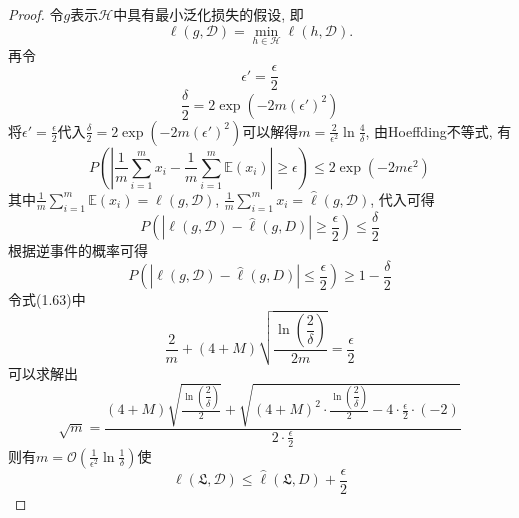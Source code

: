 \begin{proof}
令$g$表示$\mathcal{H}$中具有最小泛化损失的假设, 即
 \begin{equation}
 \ell \left( g,\mathcal{D} \right) =\min_{h\in \mathcal{H}}\ell \left( h,\mathcal{D} \right) .
 \end{equation}
 再令
\begin{equation}
  \epsilon '=\frac{\epsilon}{2} \nonumber
\end{equation}
\begin{equation}
  \frac{\delta}{2}=2\exp \left( -2m\left( \epsilon ' \right) ^2 \right) \nonumber
\end{equation}
将$\epsilon '=\frac{\epsilon}{2}$代入$\frac{\delta}{2}=2\exp \left( -2m\left( \epsilon ' \right) ^2 \right)$可以解得$m=\frac{2}{\epsilon ^2}\ln \frac{4}{\delta}$, 由Hoeffding不等式, 有
\begin{equation}
P\left( \left| \frac{1}{m}\sum_{i=1}^m{x_i}-\frac{1}{m}\sum_{i=1}^m{\mathbb{E}\left( x_i \right)} \right|\ge \epsilon \right) \le 2\exp \left( -2m\epsilon ^2 \right)
\end{equation}
其中$\frac{1}{m}\sum\limits_{i=1}^m{\mathbb{E}\left( x_i \right) =\ell \left( g,\mathcal{D} \right)}$, $\frac{1}{m}\sum\limits_{i=1}^m{x_i=\hat{\ell}\left( g,\mathcal{D} \right)}$, 代入可得
\begin{equation}
P\left( \left| \ell \left( g,\mathcal{D} \right) -\hat{\ell}\left( g,D \right) \right|\ge \frac{\epsilon}{2} \right) \le \frac{\delta}{2}
\end{equation}
根据逆事件的概率可得
\begin{equation}
P\left( \left| \ell \left( g,\mathcal{D} \right) -\hat{\ell}\left( g,D \right) \right|\le \frac{\epsilon}{2} \right) \ge 1- \frac{\delta}{2}
\end{equation}
令式(1.63)中
\begin{equation}
\frac{2}{m}+\left( 4+M \right) \sqrt{\frac{\ln \left( \dfrac{2}{\delta} \right)}{2m}}=\frac{\epsilon}{2}
\end{equation}
可以求解出
\begin{equation}
\sqrt{m}=\frac{\left( 4+M \right) \sqrt{\frac{\ln \left( \dfrac{2}{\delta} \right)}{2}}+\sqrt{\left( 4+M \right) ^2\cdot \frac{\ln \left( \dfrac{2}{\delta} \right)}{2}-4\cdot \frac{\epsilon}{2}\cdot \left( -2 \right)}}{2\cdot \frac{\epsilon}{2}}
\end{equation}
则有$m=\mathcal{O}\left( \frac{1}{\epsilon ^2}\ln \frac{1}{\delta} \right) $使
\begin{equation}
\ell \left( \mathfrak{L},\mathcal{D} \right) \le \hat{\ell}\left( \mathfrak{L},D \right) +\frac{\epsilon}{2}

\end{equation}
\end{proof}
